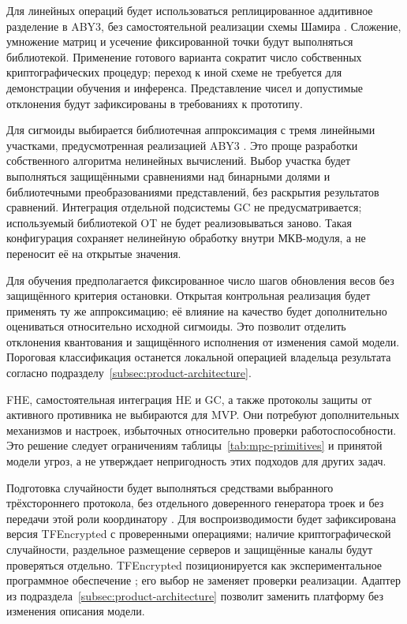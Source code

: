 Для линейных операций будет использоваться реплицированное аддитивное разделение в ABY3, без самостоятельной реализации схемы Шамира \cite{20,21}. Сложение, умножение матриц и усечение фиксированной точки будут выполняться библиотекой. Применение готового варианта сократит число собственных криптографических процедур; переход к иной схеме не требуется для демонстрации обучения и инференса. Представление чисел и допустимые отклонения будут зафиксированы в требованиях к прототипу.

Для сигмоиды выбирается библиотечная аппроксимация с тремя линейными участками, предусмотренная реализацией ABY3 \cite{21}. Это проще разработки собственного алгоритма нелинейных вычислений. Выбор участка будет выполняться защищёнными сравнениями над бинарными долями и библиотечными преобразованиями представлений, без раскрытия результатов сравнений. Интеграция отдельной подсистемы GC не предусматривается; используемый библиотекой OT не будет реализовываться заново. Такая конфигурация сохраняет нелинейную обработку внутри МКВ-модуля, а не переносит её на открытые значения.

Для обучения предполагается фиксированное число шагов обновления весов без защищённого критерия остановки. Открытая контрольная реализация будет применять ту же аппроксимацию; её влияние на качество будет дополнительно оцениваться относительно исходной сигмоиды. Это позволит отделить отклонения квантования и защищённого исполнения от изменения самой модели. Пороговая классификация останется локальной операцией владельца результата согласно подразделу~\ref{subsec:product-architecture}.

FHE, самостоятельная интеграция HE и GC, а также протоколы защиты от активного противника не выбираются для MVP. Они потребуют дополнительных механизмов и настроек, избыточных относительно проверки работоспособности. Это решение следует ограничениям таблицы~\ref{tab:mpc-primitives} и принятой модели угроз, а не утверждает непригодность этих подходов для других задач.

Подготовка случайности будет выполняться средствами выбранного трёхстороннего протокола, без отдельного доверенного генератора троек и без передачи этой роли координатору \cite{20,21}. Для воспроизводимости будет зафиксирована версия TFEncrypted с проверенными операциями; наличие криптографической случайности, раздельное размещение серверов и защищённые каналы будут проверяться отдельно. TFEncrypted позиционируется как экспериментальное программное обеспечение \cite{21}; его выбор не заменяет проверки реализации. Адаптер из подраздела~\ref{subsec:product-architecture} позволит заменить платформу без изменения описания модели.

